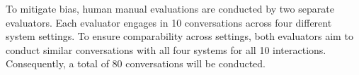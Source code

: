 To mitigate bias, human manual evaluations are conducted by two separate evaluators. Each evaluator engages in 10 conversations across four different system settings. To ensure comparability across settings, both evaluators aim to conduct similar conversations with all four systems for all 10 interactions. Consequently, a total of 80 conversations will be conducted.
    



